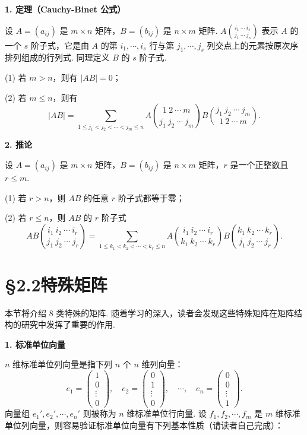 \documentclass[UTF8, 12pt, fontset=fandol, oneside]{ctexart}
\begin{document}
\noindent\textbf{1. 定理（Cauchy-Binet 公式）}

设 $A=(a_{ij})$ 是 $m\times n$ 矩阵，$B=(b_{ij})$ 是 $n\times m$ 矩阵. $A\binom{i_1\ \cdots\ i_s}{j_1\ \cdots\ j_s}$ 表示 $A$ 的一个 $s$ 阶子式，它是由 $A$ 的第 $i_1,\cdots,i_s$ 行与第 $j_1,\cdots,j_s$ 列交点上的元素按原次序排列组成的行列式. 同理定义 $B$ 的 $s$ 阶子式.

(1) 若 $m>n$，则有 $|AB|=0$；

(2) 若 $m\le n$，则有
\[
|AB|=
\sum_{1\le j_1<j_2<\cdots<j_m\le n}
A\binom{1\ 2\ \cdots\ m}{j_1\ j_2\ \cdots\ j_m}
B\binom{j_1\ j_2\ \cdots\ j_m}{1\ 2\ \cdots\ m}.
\]

\noindent\textbf{2. 推论}

设 $A=(a_{ij})$ 是 $m\times n$ 矩阵，$B=(b_{ij})$ 是 $n\times m$ 矩阵，$r$ 是一个正整数且 $r\le m$.

(1) 若 $r>n$，则 $AB$ 的任意 $r$ 阶子式都等于零；

(2) 若 $r\le n$，则 $AB$ 的 $r$ 阶子式
\[
AB\binom{i_1\ i_2\ \cdots\ i_r}{j_1\ j_2\ \cdots\ j_r}
=
\sum_{1\le k_1<k_2<\cdots<k_r\le n}
A\binom{i_1\ i_2\ \cdots\ i_r}{k_1\ k_2\ \cdots\ k_r}
B\binom{k_1\ k_2\ \cdots\ k_r}{j_1\ j_2\ \cdots\ j_r}.
\]

\section*{§2.2\quad 特殊矩阵}

本节将介绍 8 类特殊的矩阵. 随着学习的深入，读者会发现这些特殊矩阵在矩阵结构的研究中发挥了重要的作用.

\noindent\textbf{1. 标准单位向量}

$n$ 维标准单位列向量是指下列 $n$ 个 $n$ 维列向量：
\[
e_1=\left(\begin{array}{c}1\\0\\ \vdots\\0\end{array}\right),\quad
e_2=\left(\begin{array}{c}0\\1\\ \vdots\\0\end{array}\right),\quad
\cdots,\quad
e_n=\left(\begin{array}{c}0\\0\\ \vdots\\1\end{array}\right).
\]
向量组 $e_1',e_2',\cdots,e_n'$ 则被称为 $n$ 维标准单位行向量. 设 $f_1,f_2,\cdots,f_m$ 是 $m$ 维标准单位列向量，则容易验证标准单位向量有下列基本性质（请读者自己完成）：
\end{document}
